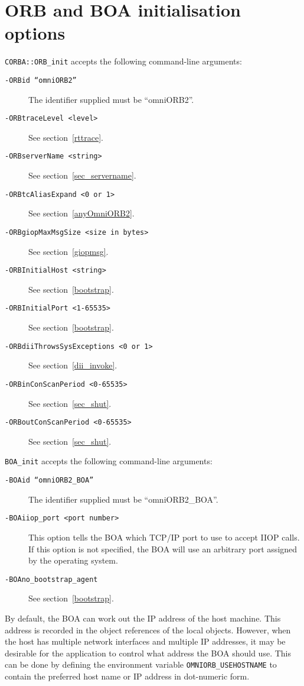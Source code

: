 \documentclass[11pt,twoside,onecolumn]{book}
\begin{document}
\section{ORB and BOA initialisation options}
\label{omniorbapioptions}

{\tt CORBA::ORB\_init} accepts the following command-line arguments:

\begin{description}

\item[\tt -ORBid ``omniORB2''] The identifier supplied must be ``omniORB2''.
\item[\tt -ORBtraceLevel <level>] See section~\ref{rttrace}.
\item[\tt -ORBserverName <string>] See section~\ref{sec_servername}.
\item[\tt -ORBtcAliasExpand <0 or 1>] See section~\ref{anyOmniORB2}.
\item[\tt -ORBgiopMaxMsgSize <size in bytes>] See section~\ref{giopmsg}.
\item[\tt -ORBInitialHost <string>] See section~\ref{bootstrap}.
\item[\tt -ORBInitialPort <1-65535>] See section~\ref{bootstrap}.
\item[\tt -ORBdiiThrowsSysExceptions <0 or 1>] See section~\ref{dii_invoke}.
\item[\tt -ORBinConScanPeriod <0-65535>] See section~\ref{sec_shut}.
\item[\tt -ORBoutConScanPeriod <0-65535>] See section~\ref{sec_shut}.
\end{description}

{\tt BOA\_init} accepts the following command-line arguments:

\begin{description}

\item[\tt -BOAid ``omniORB2\_BOA''] The identifier supplied must be ``omniORB2\_BOA''.
\item[\tt -BOAiiop\_port <port number>] This option tells the BOA which
TCP/IP port to use to accept IIOP calls. If this option is not specified,
the BOA will use an arbitrary port assigned by the operating system.
\item[\tt -BOAno\_bootstrap\_agent] See section~\ref{bootstrap}.
\end{description}

By default, the BOA can work out the IP address of the host machine. This
address is recorded in the object references of the local objects.
However, when the host has multiple network interfaces and multiple IP
addresses, it may be desirable for the application to control what address
the BOA should use. This can be done by defining the environment variable
{\tt OMNIORB\_USEHOSTNAME} to contain the preferred host name or IP
address in dot-numeric form.
\end{document}
